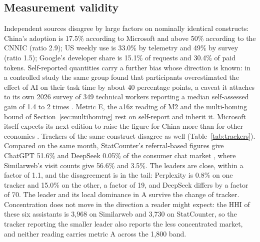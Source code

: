 \documentclass[11pt]{article}
\begin{document}
\subsection{Measurement validity} Independent sources disagree by large factors on nominally identical constructs: China's adoption is 17.5\% according to Microsoft and above 50\% according to the CNNIC (ratio 2.9); US weekly use is 33.0\% by telemetry and 49\% by survey (ratio 1.5); Google's developer share is 15.1\% of requests and 30.4\% of paid tokens. Self-reported quantities carry a further bias whose direction is known: in a controlled study the same group found that participants overestimated the effect of AI on their task time by about 40 percentage points, a caveat it attaches to its own 2026 survey of 349 technical workers reporting a median self-assessed gain of 1.4 to 2 times \cite{metr2026survey}. Metric E, the a16z reading of M2 and the multi-homing bound of Section~\ref{sec:multihoming} rest on self-report and inherit it. Microsoft itself expects its next edition to raise the figure for China more than for other economies \cite{microsoft2026q2}. Trackers of the same construct disagree as well (Table~\ref{tab:trackers}). Compared on the same month, StatCounter's referral-based figures give ChatGPT 51.6\% and DeepSeek 0.05\% of the consumer chat market \cite{statcounter2026}, where Similarweb's visit counts give 56.6\% and 3.5\%. The leaders are close, within a factor of 1.1, and the disagreement is in the tail: Perplexity is 0.8\% on one tracker and 15.0\% on the other, a factor of 19, and DeepSeek differs by a factor of 70. The leader and its local dominance in A survive the change of tracker. Concentration does not move in the direction a reader might expect: the HHI of these six assistants is 3{,}968 on Similarweb and 3{,}730 on StatCounter, so the tracker reporting the smaller leader also reports the less concentrated market, and neither reading carries metric A across the 1{,}800 band.
\end{document}

